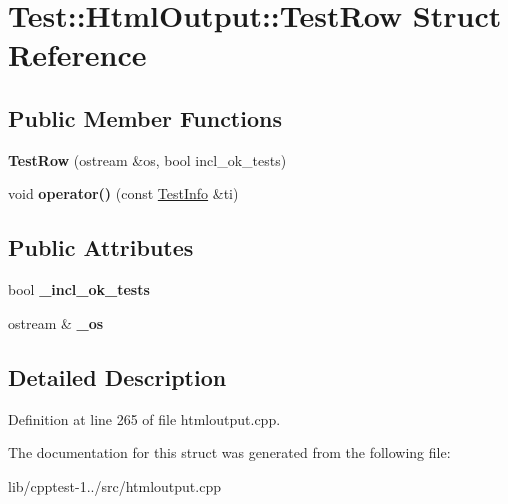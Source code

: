 \hypertarget{struct_test_1_1_html_output_1_1_test_row}{}\section{Test\+:\+:Html\+Output\+:\+:Test\+Row Struct Reference}
\label{struct_test_1_1_html_output_1_1_test_row}
\subsection*{Public Member Functions}
\begin{DoxyCompactItemize}
\item 
{\bfseries Test\+Row} (ostream \&os, bool incl\+\_\+ok\+\_\+tests)\hypertarget{struct_test_1_1_html_output_1_1_test_row_a6b1fda89cb8b52c6dbc2e356c429e809}{}\label{struct_test_1_1_html_output_1_1_test_row_a6b1fda89cb8b52c6dbc2e356c429e809}

\item 
void {\bfseries operator()} (const \hyperlink{struct_test_1_1_collector_output_1_1_test_info}{Test\+Info} \&ti)\hypertarget{struct_test_1_1_html_output_1_1_test_row_a8d0aa0f0f3d5a9f56e6a1c4171956a17}{}\label{struct_test_1_1_html_output_1_1_test_row_a8d0aa0f0f3d5a9f56e6a1c4171956a17}

\end{DoxyCompactItemize}
\subsection*{Public Attributes}
\begin{DoxyCompactItemize}
\item 
bool {\bfseries \+\_\+incl\+\_\+ok\+\_\+tests}\hypertarget{struct_test_1_1_html_output_1_1_test_row_a098830d7a70b454924711182f03618da}{}\label{struct_test_1_1_html_output_1_1_test_row_a098830d7a70b454924711182f03618da}

\item 
ostream \& {\bfseries \+\_\+os}\hypertarget{struct_test_1_1_html_output_1_1_test_row_ad079cbad0cc1ca7e3033fd756fefb3d5}{}\label{struct_test_1_1_html_output_1_1_test_row_ad079cbad0cc1ca7e3033fd756fefb3d5}

\end{DoxyCompactItemize}


\subsection{Detailed Description}


Definition at line 265 of file htmloutput.\+cpp.



The documentation for this struct was generated from the following file\+:\begin{DoxyCompactItemize}
\item 
lib/cpptest-\/1../src/htmloutput.\+cpp\end{DoxyCompactItemize}
